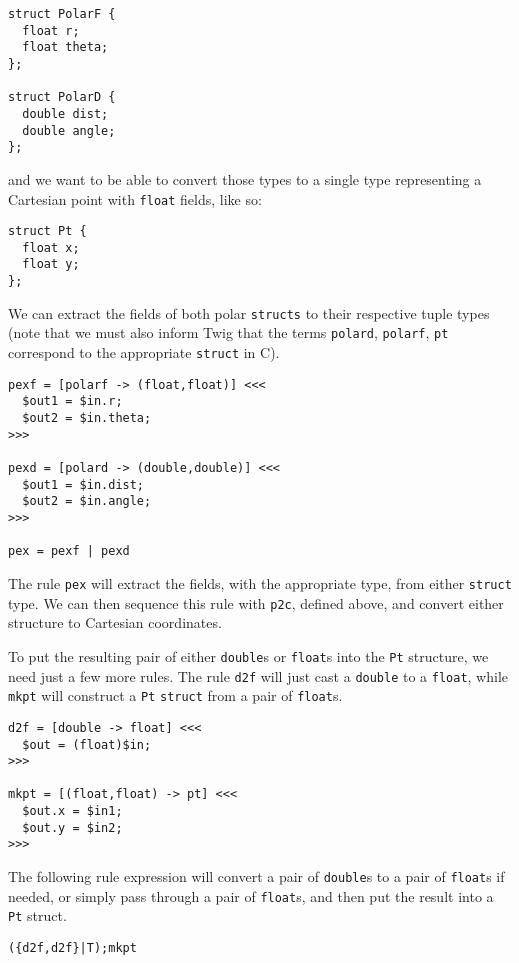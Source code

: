 \begin{verbatim}
struct PolarF {
  float r;
  float theta;
};

struct PolarD {
  double dist;
  double angle;
};
\end{verbatim}

and we want to be able to convert those types to a single type representing a Cartesian point with \texttt{float} fields, like so:

\begin{verbatim}
struct Pt {
  float x;
  float y;
};
\end{verbatim}

We can extract the fields of both polar \texttt{structs} to their respective tuple types (note that we must also inform Twig that the terms \texttt{polard}, \texttt{polarf}, \texttt{pt} correspond to the appropriate \texttt{struct} in C).

\begin{verbatim}
pexf = [polarf -> (float,float)] <<<
  $out1 = $in.r;
  $out2 = $in.theta;
>>>

pexd = [polard -> (double,double)] <<<
  $out1 = $in.dist;
  $out2 = $in.angle;
>>>

pex = pexf | pexd
\end{verbatim}

The rule \texttt{pex} will extract the fields, with the appropriate type, from either \texttt{struct} type. We can then sequence this rule with \texttt{p2c}, defined above, and convert either structure to Cartesian coordinates.

To put the resulting pair of either \texttt{double}s or \texttt{float}s into the \texttt{Pt} structure, we need just a few more rules. The rule \texttt{d2f} will just cast a \texttt{double} to a \texttt{float}, while \texttt{mkpt} will construct a \texttt{Pt} \texttt{struct} from a pair of \texttt{float}s.

\begin{verbatim}
d2f = [double -> float] <<<
  $out = (float)$in;
>>>
  
mkpt = [(float,float) -> pt] <<<
  $out.x = $in1;
  $out.y = $in2;
>>>
\end{verbatim}

The following rule expression will convert a pair of \texttt{double}s to a pair of \texttt{float}s if needed, or simply pass through a pair of \texttt{float}s, and then put the result into a \texttt{Pt} struct.

\begin{verbatim}
({d2f,d2f}|T);mkpt
\end{verbatim}

